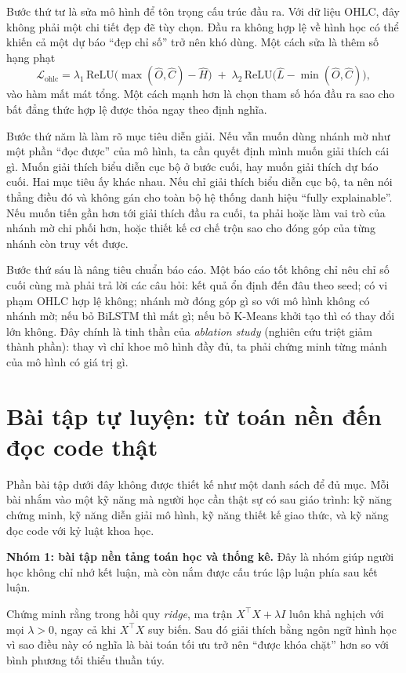 Bước thứ tư là sửa mô hình để tôn trọng cấu trúc đầu ra. Với dữ liệu OHLC, đây không phải một chi tiết đẹp đẽ tùy chọn. Đầu ra không hợp lệ về hình học có thể khiến cả một dự báo ``đẹp chỉ số'' trở nên khó dùng. Một cách sửa là thêm số hạng phạt
\[
\mathcal{L}_{\mathrm{ohlc}}
=
\lambda_1 \,\mathrm{ReLU}\!\bigl(\max(\widehat O,\widehat C)-\widehat H\bigr)
\;+\;
\lambda_2 \,\mathrm{ReLU}\!\bigl(\widehat L-\min(\widehat O,\widehat C)\bigr),
\]
vào hàm mất mát tổng. Một cách mạnh hơn là chọn tham số hóa đầu ra sao cho bất đẳng thức hợp lệ được thỏa ngay theo định nghĩa.

Bước thứ năm là làm rõ mục tiêu diễn giải. Nếu vẫn muốn dùng nhánh mờ như một phần ``đọc được'' của mô hình, ta cần quyết định mình muốn giải thích cái gì. Muốn giải thích biểu diễn cục bộ ở bước cuối, hay muốn giải thích dự báo cuối. Hai mục tiêu ấy khác nhau. Nếu chỉ giải thích biểu diễn cục bộ, ta nên nói thẳng điều đó và không gán cho toàn bộ hệ thống danh hiệu ``fully explainable''. Nếu muốn tiến gần hơn tới giải thích đầu ra cuối, ta phải hoặc làm vai trò của nhánh mờ chi phối hơn, hoặc thiết kế cơ chế trộn sao cho đóng góp của từng nhánh còn truy vết được.

Bước thứ sáu là nâng tiêu chuẩn báo cáo. Một báo cáo tốt không chỉ nêu chỉ số cuối cùng mà phải trả lời các câu hỏi: kết quả ổn định đến đâu theo seed; có vi phạm OHLC hợp lệ không; nhánh mờ đóng góp gì so với mô hình không có nhánh mờ; nếu bỏ BiLSTM thì mất gì; nếu bỏ K-Means khởi tạo thì có thay đổi lớn không. Đây chính là tinh thần của \emph{ablation study} (nghiên cứu triệt giảm thành phần): thay vì chỉ khoe mô hình đầy đủ, ta phải chứng minh từng mảnh của mô hình có giá trị gì.

\section{Bài tập tự luyện: từ toán nền đến đọc code thật}

Phần bài tập dưới đây không được thiết kế như một danh sách để đủ mục. Mỗi bài nhắm vào một kỹ năng mà người học cần thật sự có sau giáo trình: kỹ năng chứng minh, kỹ năng diễn giải mô hình, kỹ năng thiết kế giao thức, và kỹ năng đọc code với kỷ luật khoa học.

\textbf{Nhóm 1: bài tập nền tảng toán học và thống kê.} Đây là nhóm giúp người học không chỉ nhớ kết luận, mà còn nắm được cấu trúc lập luận phía sau kết luận.

\begin{exercise}
Chứng minh rằng trong hồi quy \emph{ridge}, ma trận \(X^\top X+\lambda I\) luôn khả nghịch với mọi \(\lambda>0\), ngay cả khi \(X^\top X\) suy biến. Sau đó giải thích bằng ngôn ngữ hình học vì sao điều này có nghĩa là bài toán tối ưu trở nên ``được khóa chặt'' hơn so với bình phương tối thiểu thuần túy.
\end{exercise}

